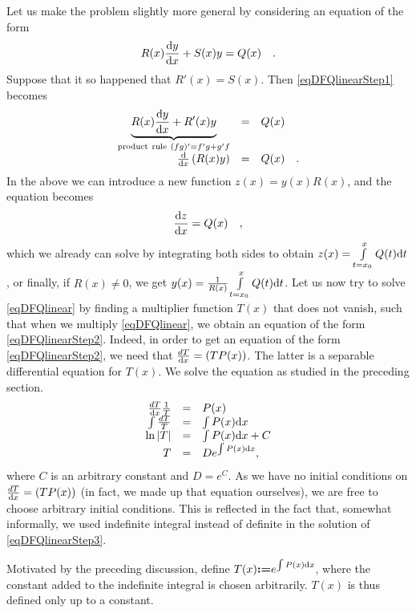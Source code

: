 \documentclass[12pt]{book}
\newcommand{\eqdef}{\textbf{:=}}
\begin{document}
Let us make the problem slightly more general by considering an equation of the form
\begin{equation}\label{eqDFQlinearStep1}
R(x)\frac{{\normalfont \text{d}} y}{{\normalfont \text{d}} x} + S(x)y=Q(x)\quad .
\end{equation}
Suppose that it so happened that $R'(x)=S(x)$. Then \eqref{eqDFQlinearStep1} becomes
\begin{equation}\label{eqDFQlinearStep2}
\begin{array}{rcl}
\underbrace{R(x)\frac{{\normalfont \text{d}} y}{{\normalfont \text{d}} x} + R'(x)y}_{\mathrm{product~rule~}(fg)'=f'g+g'f}&=&Q(x)\\
\frac{{\normalfont \text{d}}}{{\normalfont \text{d}} x} \left(R(x)y \right)&=& Q(x)\quad .
\end{array}
\end{equation}
In the above we can introduce a new function $z(x)= y(x)R(x)$, and the equation becomes
\[
\frac{{\normalfont \text{d}} z}{{\normalfont \text{d}} x}= Q(x)\quad ,
\]
which we already can solve by integrating both sides to obtain $z(x)= \int\limits_{t=x_0}^x Q(t){\normalfont \text{d}} t $, or finally, if $R(x)\neq 0$, we get $y(x)= \frac{1}{R(x)}\int\limits_{t=x_0}^x Q(t){\normalfont \text{d}} t $.
Let us now try to solve \eqref{eqDFQlinear} by finding a multiplier function $T(x)$ that does not vanish, such that when we multiply \eqref{eqDFQlinear}, we obtain an equation of the form \eqref{eqDFQlinearStep2}. Indeed, in order to get an equation of the form \eqref{eqDFQlinearStep2}, we need that $\frac{dT}{{\normalfont \text{d}} x}= (TP(x))$. The latter is a separable differential equation for $T(x)$.  We solve the equation as studied in the preceding section.
\begin{equation}\label{eqDFQlinearStep3}
\begin{array}{rcl}
\frac{dT}{{\normalfont \text{d}} x}\frac{1}{T}&=&P(x)\\
\int\frac{dT}{T}&=&\int P(x){\normalfont \text{d}} x\\
\ln |T|&=&  \int P(x){\normalfont \text{d}} x+C\\
T&=&De^{\int P(x){\normalfont \text{d}} x},
\end{array}
\end{equation}
where $C$ is an arbitrary constant and $D=e^C$. As we have no initial conditions on $\frac{dT}{{\normalfont \text{d}} x}= (TP(x))$ (in fact, we made up that equation ourselves), we are free to choose arbitrary initial conditions. This is reflected in the fact that, somewhat informally, we used indefinite integral instead of definite in the solution of \eqref{eqDFQlinearStep3}.

Motivated by the preceding discussion, define $T(x)\eqdef e^{\int P(x)\diff x}$, where the constant added to the indefinite integral is chosen arbitrarily. $T(x)$ is thus defined only up to a constant.
\end{document}
